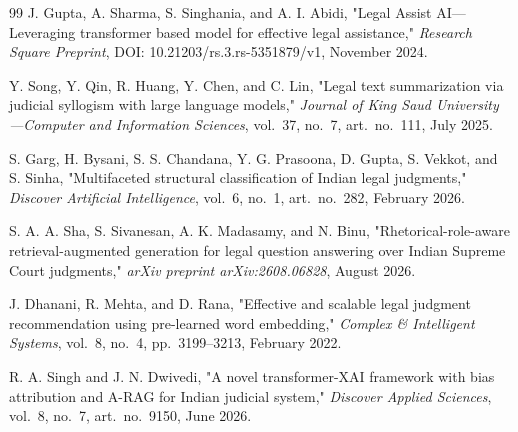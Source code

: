 \documentclass[12pt,a4paper]{report}
\begin{document}
\begin{thebibliography}{99}
J. Gupta, A. Sharma, S. Singhania, and A. I. Abidi, "Legal Assist AI---Leveraging transformer based model for effective legal assistance," \textit{Research Square Preprint}, DOI: 10.21203/rs.3.rs-5351879/v1, November 2024.

Y. Song, Y. Qin, R. Huang, Y. Chen, and C. Lin, "Legal text summarization via judicial syllogism with large language models," \textit{Journal of King Saud University---Computer and Information Sciences}, vol.~37, no.~7, art.~no.~111, July 2025.

S. Garg, H. Bysani, S. S. Chandana, Y. G. Prasoona, D. Gupta, S. Vekkot, and S. Sinha, "Multifaceted structural classification of Indian legal judgments," \textit{Discover Artificial Intelligence}, vol.~6, no.~1, art.~no.~282, February 2026.

S. A. A. Sha, S. Sivanesan, A. K. Madasamy, and N. Binu, "Rhetorical-role-aware retrieval-augmented generation for legal question answering over Indian Supreme Court judgments," \textit{arXiv preprint arXiv:2608.06828}, August 2026.

J. Dhanani, R. Mehta, and D. Rana, "Effective and scalable legal judgment recommendation using pre-learned word embedding," \textit{Complex \& Intelligent Systems}, vol.~8, no.~4, pp.~3199--3213, February 2022.

R. A. Singh and J. N. Dwivedi, "A novel transformer-XAI framework with bias attribution and A-RAG for Indian judicial system," \textit{Discover Applied Sciences}, vol.~8, no.~7, art.~no.~9150, June 2026.

\end{thebibliography}
\end{document}
